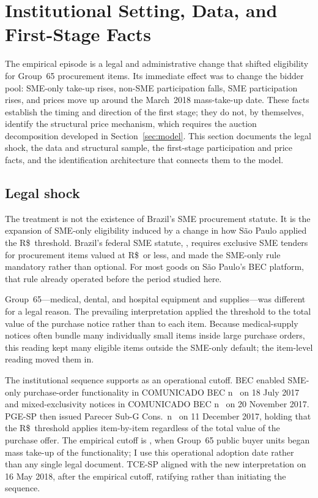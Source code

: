 \section{Institutional Setting, Data, and First-Stage Facts}\label{sec:setting}

The empirical episode is a legal and administrative change that shifted
eligibility for Group~65 procurement items. Its immediate effect was to
change the bidder pool: SME-only take-up rises, non-SME participation
falls, SME participation rises, and prices move up around the March~2018
mass-take-up date. These facts establish the timing and direction of the
first stage; they do not, by themselves, identify the structural price
mechanism, which requires the auction decomposition developed in
Section~\ref{sec:model}. This section documents the legal shock, the data
and structural sample, the first-stage participation and price facts, and
the identification architecture that connects them to the model.

\subsection{Legal shock}

The treatment is not the existence of Brazil's SME procurement statute. It
is the expansion of SME-only eligibility induced by a change in how
S\~ao Paulo applied the R\$\,\setAsideThreshBRL{} threshold. Brazil's
federal SME statute, \LCSmeStatute{}, requires exclusive SME tenders for
procurement items valued at R\$\,\setAsideThreshBRL{} or less, and
\LCSetAsideAct{} made the SME-only rule mandatory rather than optional.
For most goods on S\~ao Paulo's BEC platform, that rule already operated
before the period studied here.

Group~65---medical, dental, and hospital equipment and supplies---was
different for a legal reason. The prevailing interpretation applied the
threshold to the total value of the purchase notice rather than to each
item. Because medical-supply notices often bundle many individually small
items inside large purchase orders, this reading kept many eligible items
outside the SME-only default; the item-level reading moved them in.

The institutional sequence supports \policyCutoffMonth{} as an operational
cutoff. BEC enabled SME-only purchase-order functionality in COMUNICADO
BEC n\textordmasculine~\comunicadoBECone{} on 18 July 2017 and
mixed-exclusivity notices in COMUNICADO BEC
n\textordmasculine~\comunicadoBECtwo{} on 20 November 2017. PGE-SP then
issued Parecer Sub-G Cons.\ n\textordmasculine~\pareceNum{} on 11 December
2017, holding that the R\$\,\setAsideThreshBRL{} threshold applies
item-by-item regardless of the total value of the purchase offer. The
empirical cutoff is \policyCutoffMonth{}, when Group~65 public buyer units
began mass take-up of the functionality; I use this operational adoption
date rather than any single legal document. TCE-SP aligned
with the new interpretation on 16 May 2018, after the empirical cutoff,
ratifying rather than initiating the sequence.

